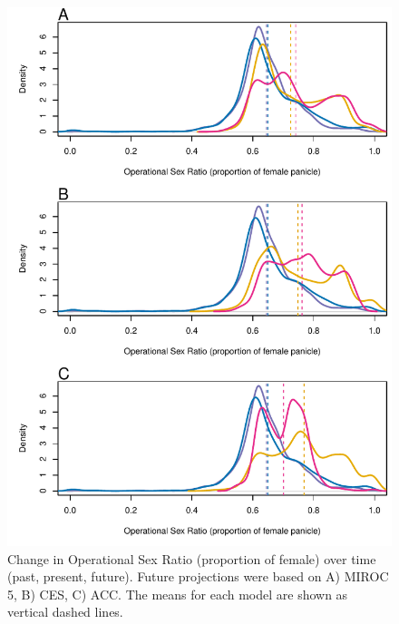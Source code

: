 \documentclass[12pt]{article}
\begin{document}

\begin{figure}[H]
  \begin{center}
    \includegraphics[width=0.80\linewidth]{Figures/POAR_OSR_MIROC_CES_ACC.pdf}
  \caption{Change in Operational Sex Ratio (proportion of female) over time (past, present, future).
  Future projections were based on A) MIROC 5, B) CES, C) ACC.
  The means for each model are shown as vertical dashed lines.}
  \label{Sup:osrall}
  \end{center}
\end{figure}
\end{document}
